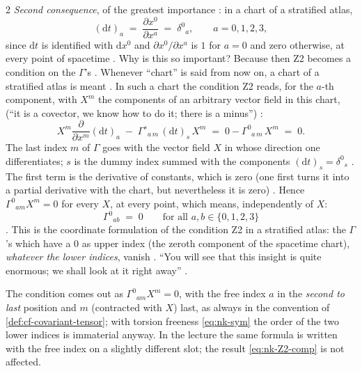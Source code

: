\begin{paracol}{2}
\emph{Second consequence}, of the greatest importance : in a chart of a stratified atlas,
\[
  (\mathrm dt)_a\;=\;\frac{\partial x^0}{\partial x^a}\;=\;\delta^0{}_a ,\qquad a=0,1,2,3,
\]
since $\mathrm dt$ is identified with $\mathrm dx^0$ and $\partial x^0/\partial x^a$ is $1$ for $a=0$ and zero otherwise, at every point of spacetime
. Why is this so important? Because then Z2 becomes a condition on the $\Gamma$'s . Whenever ``chart'' is said from now on, a chart of a stratified atlas is meant
. In such a chart the condition Z2 reads, for the $a$-th component, with $X^m$ the components of an arbitrary vector field in this chart,
(``it is a covector, we know how to do it; there is a minus'') :
\[
  X^m\frac{\partial}{\partial x^m}(\mathrm dt)_a\;-\;\Gamma^s{}_{a\,m}\,(\mathrm dt)_s\,X^m
  \;=\;0-\Gamma^0{}_{a\,m}\,X^m\;=\;0 .
\]
The last index $m$ of $\Gamma$ goes with the vector field $X$ in whose direction one differentiates; $s$ is the dummy index summed with the components $(\mathrm dt)_s=\delta^0{}_s$ . The first term is the derivative of
constants, which is zero (one first turns it into a partial derivative with the chart, but nevertheless it is zero) . Hence $\Gamma^0{}_{am}X^m=0$ for every $X$, at every point, which means, independently of $X$:
\begin{equation}\label{eq:nk-Z2-comp}
  \Gamma^0{}_{ab}\;=\;0\qquad\text{for all }a,b\in\{0,1,2,3\}
\end{equation}
. This is the coordinate formulation of the condition Z2 in a stratified atlas: the $\Gamma$'s which have a $0$ as upper index (the zeroth component of the spacetime chart), \emph{whatever the lower indices}, vanish .
``You will see that this insight is quite enormous; we shall look at it right away'' .

\begin{coursenote}
The condition comes out as $\Gamma^0{}_{am}X^m=0$, with the free index $a$ in the \emph{second to last} position and $m$ (contracted with $X$) last, as always in the convention of \cref{def:cf-covariant-tensor};
with torsion freeness \eqref{eq:nk-sym} the order of the two lower indices is immaterial anyway. In the lecture the same formula is written with the free index on a slightly different slot; the result \eqref{eq:nk-Z2-comp} is not affected.
\end{coursenote}


\end{paracol}
